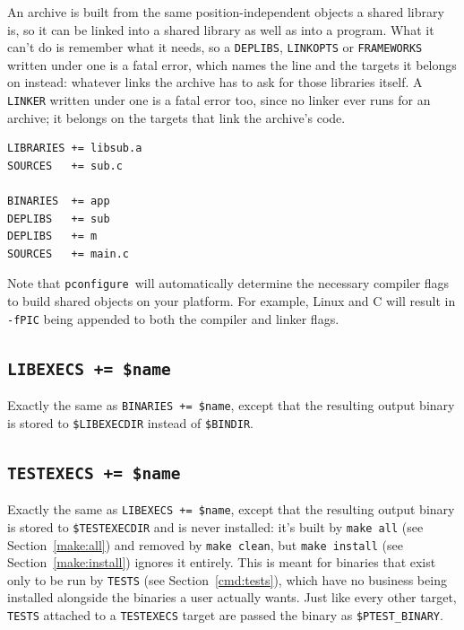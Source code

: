 \documentclass{article}
\newcommand{\pconfigure}{\texttt{pconfigure}}
\begin{document}
An archive is built from the same position-independent objects a
shared library is, so it can be linked into a shared library as well
as into a program.  What it can't do is remember what it needs, so a
\texttt{DEPLIBS}, \texttt{LINKOPTS} or \texttt{FRAMEWORKS} written
under one is a fatal error, which names the line and the targets it
belongs on instead: whatever links the archive has to ask for those
libraries itself.  A \texttt{LINKER} written under one is a fatal
error too, since no linker ever runs for an archive; it belongs on
the targets that link the archive's code.

\begin{verbatim}
LIBRARIES += libsub.a
SOURCES   += sub.c

BINARIES  += app
DEPLIBS   += sub
DEPLIBS   += m
SOURCES   += main.c
\end{verbatim}

Note that \pconfigure\ will automatically determine the necessary
compiler flags to build shared objects on your platform.  For example,
Linux and C will result in \texttt{-fPIC} being appended to both the
compiler and linker flags.

\subsection{\texttt{LIBEXECS += \$name} \label{cmd:libexecs}}

Exactly the same as \texttt{BINARIES += \$name}, except that the
resulting output binary is stored to \texttt{\$LIBEXECDIR} instead of
\texttt{\$BINDIR}.

\subsection{\texttt{TESTEXECS += \$name} \label{cmd:testexecs}}

Exactly the same as \texttt{LIBEXECS += \$name}, except that the
resulting output binary is stored to \texttt{\$TESTEXECDIR} and is
never installed: it's built by \texttt{make all} (see
Section~\ref{make:all}) and removed by \texttt{make clean}, but
\texttt{make install} (see Section~\ref{make:install}) ignores it
entirely.  This is meant for binaries that exist only to be run by
\texttt{TESTS} (see Section~\ref{cmd:tests}), which have no business
being installed alongside the binaries a user actually wants.  Just
like every other target, \texttt{TESTS} attached to a
\texttt{TESTEXECS} target are passed the binary as
\texttt{\$PTEST\_BINARY}.
\end{document}

